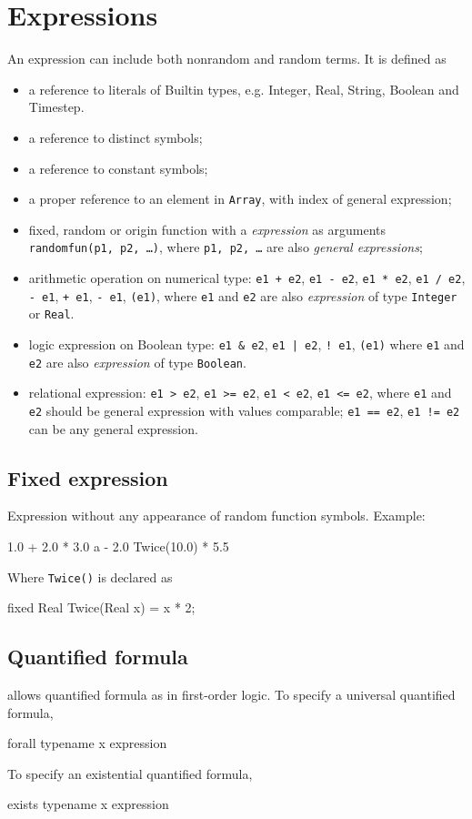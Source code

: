 \documentclass[12pt]{article}
\begin{document}
\section{Expressions}
\label{sec:expression}
An expression can include both nonrandom and random terms.
It is defined as
\begin{itemize}
\item a reference to literals of Builtin types, e.g. Integer, Real, String, Boolean and Timestep.
\item a reference to distinct symbols;
\item a reference to constant symbols;
\item a proper reference to an element in {\tt Array}, with index of general expression;
 \item fixed, random or origin function with a \emph{expression} as arguments {\tt randomfun(p1, p2, \dots)},
  where {\tt p1, p2, \dots} are also \emph{general expressions};
\item arithmetic operation on numerical type: \texttt{e1 + e2}, \texttt{e1 - e2}, \texttt{e1 * e2}, \texttt{e1 / e2},  \texttt{- e1}, \texttt{+ e1}, \texttt{- e1}, \texttt{(e1)}, where \texttt{e1} and \texttt{e2} are also \emph{expression} of type \texttt{Integer} or \texttt{Real}.
\item logic expression on Boolean type: \texttt{e1 \& e2}, \texttt{e1 | e2}, \texttt{! e1}, \texttt{(e1)} where 
\texttt{e1} and \texttt{e2} are also \emph{expression} of type \texttt{Boolean}.
\item relational expression: \texttt{e1 > e2}, \texttt{e1 >= e2}, \texttt{e1 < e2}, \texttt{e1 <= e2}, where \texttt{e1} and \texttt{e2} should be general expression with values comparable; \texttt{e1 == e2}, \texttt{e1 != e2} can be any general expression.
\end{itemize}

\subsection{Fixed expression}
Expression without any appearance of random function symbols. 
Example:
\begin{blogcode}
1.0 + 2.0 * 3.0
a - 2.0
Twice(10.0) * 5.5
\end{blogcode}
Where \texttt{Twice(\mycdot)} is declared as 
\begin{blogcode}
fixed Real Twice(Real x) = x * 2;
\end{blogcode}

\subsection{Quantified formula}
\bl allows quantified formula as in first-order logic. To specify a universal quantified formula, 
\begin{blogcode}
forall typename x expression
\end{blogcode}
To specify an existential quantified formula,
\begin{blogcode}
exists typename x expression
\end{blogcode}
\end{document}
